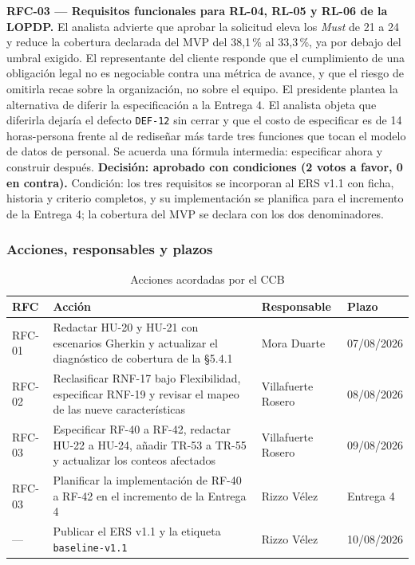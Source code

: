 \documentclass[11pt,letterpaper]{article}
\begin{document}
\noindent\textbf{RFC-03 --- Requisitos funcionales para RL-04, RL-05 y RL-06 de la LOPDP.}
El analista advierte que aprobar la solicitud eleva los \emph{Must} de 21 a 24 y reduce la cobertura
declarada del MVP del 38,1\,\% al 33,3\,\%, ya por debajo del umbral exigido. El representante del
cliente responde que el cumplimiento de una obligación legal no es negociable contra una métrica de
avance, y que el riesgo de omitirla recae sobre la organización, no sobre el equipo. El presidente
plantea la alternativa de diferir la especificación a la Entrega 4. El analista objeta que diferirla
dejaría el defecto \texttt{DEF-12} sin cerrar y que el costo de especificar es de 14 horas-persona
frente al de rediseñar más tarde tres funciones que tocan el modelo de datos de personal. Se acuerda
una fórmula intermedia: especificar ahora y construir después.
\textbf{Decisión: aprobado con condiciones (2 votos a favor, 0 en contra).} Condición: los tres
requisitos se incorporan al ERS v1.1 con ficha, historia y criterio completos, y su implementación se
planifica para el incremento de la Entrega 4; la cobertura del MVP se declara con los dos
denominadores.

\subsubsection*{Acciones, responsables y plazos}

\begin{table}[H]
\centering\footnotesize
\caption{Acciones acordadas por el CCB}
\begin{tabular}{L{1.4cm} L{7.2cm} L{3.2cm} L{2.6cm}}
\toprule
\textbf{RFC} & \textbf{Acción} & \textbf{Responsable} & \textbf{Plazo}\\
\midrule
RFC-01 & Redactar HU-20 y HU-21 con escenarios Gherkin y actualizar el diagnóstico de cobertura de la \S5.4.1 & Mora Duarte & 07/08/2026\\
RFC-02 & Reclasificar RNF-17 bajo Flexibilidad, especificar RNF-19 y revisar el mapeo de las nueve características & Villafuerte Rosero & 08/08/2026\\
RFC-03 & Especificar RF-40 a RF-42, redactar HU-22 a HU-24, añadir TR-53 a TR-55 y actualizar los conteos afectados & Villafuerte Rosero & 09/08/2026\\
RFC-03 & Planificar la implementación de RF-40 a RF-42 en el incremento de la Entrega 4 & Rizzo Vélez & Entrega 4\\
--- & Publicar el ERS v1.1 y la etiqueta \texttt{baseline-v1.1} & Rizzo Vélez & 10/08/2026\\
\bottomrule
\end{tabular}
\end{table}
\end{document}
